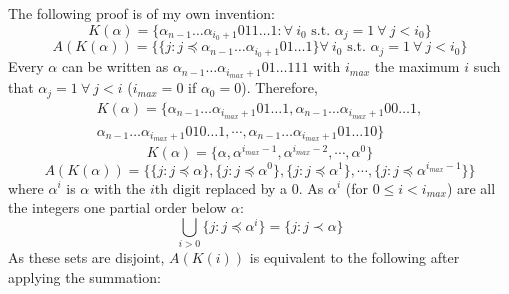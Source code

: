 \documentclass[twoside]{article}
\begin{document}
\noindent
The following proof is of my own invention:
\begin{equation}
        K(\alpha) = \{ \alpha_{n-1} \ldots \alpha_{i_0 +1} 0 11 \ldots 1: \forall \>i_0\text{ s.t. } \alpha_{j} = 1 \> \forall \>j<i_0\}
\end{equation}
\begin{equation}
        \label{AK}
A(K(\alpha)) =  \{\{  j: j \preceq \alpha_{n-1} \ldots \alpha_{i_0+1}0 1 \ldots 1 \}\forall \>i_0\text{ s.t. } \alpha_{j} = 1 \> \forall \>j<i_0\}
\end{equation}
Every $\alpha$ can be written as $\alpha_{n-1}\ldots \alpha_{i_{max}+1}01\ldots 111$ with $i_{max}$ the maximum $i$ such that $\alpha_j =1 \> \forall \> j<i$ ($i_{max} = 0$ if $\alpha_0 = 0$). Therefore, 
\begin{multline}
        K(\alpha) = \{ \alpha_{n-1} \ldots \alpha_{i_{max}+1}0 1 \ldots 1 , \alpha_{n-1} \ldots \alpha_{i_{max}+1}0 0\ldots 1 ,\\ \alpha_{n-1} \ldots \alpha_{i_{max}+1}0 10 \ldots 1 , \cdots ,\alpha_{n-1} \ldots \alpha_{i_{max}+1}0 1 \ldots 10 \} \end{multline}
\begin{equation}
        K(\alpha) = \{ \alpha, \alpha^{i_{max}-1}, \alpha^{i_{max}-2}, \cdots, \alpha^0 \}
        \label{Kwrittenout}
\end{equation}
\begin{equation}
                A(K(\alpha)) = \{ \{ j: j \preceq \alpha \}, \{ j: j \preceq \alpha^0 \},\{ j: j \preceq \alpha^1 \}, \cdots, \{ j: j \preceq \alpha^{i_{max}-1} \} \}
        \end{equation}
        where $\alpha^i$ is $\alpha$ with the $i$th digit replaced by a $0$. As $\alpha^i$ (for $0\leq i< i_{max}$) are all the integers one partial order below $\alpha$:
        \begin{equation}\bigcup_{i>0} \{j: j \preceq \alpha^i\} = \{j: j \prec \alpha\}\end{equation}
        As these sets are disjoint, $A(K(i))$ is equivalent to the following after applying the summation:
\end{document}
